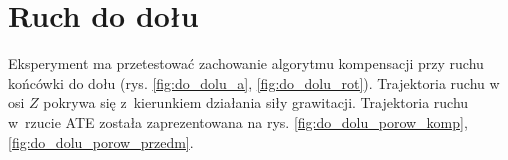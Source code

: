 
\section{Ruch do dołu}

Eksperyment ma przetestować zachowanie algorytmu kompensacji przy ruchu końcówki do dołu (rys. \ref{fig:do_dolu_a}, \ref{fig:do_dolu_rot}). Trajektoria ruchu w osi $Z$ pokrywa się z~kierunkiem działania siły grawitacji. Trajektoria ruchu w~rzucie ATE została zaprezentowana na rys. \ref{fig:do_dolu_porow_komp}, \ref{fig:do_dolu_porow_przedm}.

